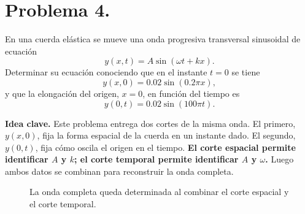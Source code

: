 \documentclass[11pt]{article}
\newcommand{\ideaclave}[1]{%
  \par\medskip
  \noindent\textbf{Idea clave.} #1\par
}
\begin{document}
\section*{Problema 4.}
En una cuerda el\'astica se mueve una onda progresiva transversal sinusoidal de ecuaci\'on
\begin{equation*}
    y(x,t)=A\sin(\omega t+kx).
\end{equation*}
Determinar su ecuaci\'on conociendo que en el instante $t=0$ se tiene
\begin{equation*}
    y(x,0)=0.02\sin(0.2\pi x),
\end{equation*}
y que la elongaci\'on del origen, $x=0$, en funci\'on del tiempo es
\begin{equation*}
    y(0,t)=0.02\sin(100\pi t).
\end{equation*}

\ideaclave{Este problema entrega dos cortes de la misma onda. El primero, $y(x,0)$, fija la forma espacial de la cuerda en un instante dado. El segundo, $y(0,t)$, fija c\'omo oscila el origen en el tiempo.
\textbf{El corte espacial permite identificar $A$ y $k$; el corte temporal permite identificar $A$ y $\omega$.} Luego ambos datos se combinan para reconstruir la onda completa.}

\begin{figure}[H]
\centering
{}
\caption{La onda completa queda determinada al combinar el corte espacial y el corte temporal.}
\label{fig:p4_cortes}
\end{figure}
\end{document}
